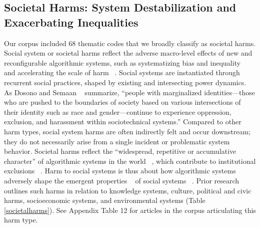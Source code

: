 \subsection{Societal Harms: System Destabilization and Exacerbating Inequalities}
Our corpus included 68 thematic codes that we broadly classify as societal harms. 
Social system or societal harms reflect the adverse macro-level effects of new and reconfigurable algorithmic systems, such as systematizing bias and inequality ~\cite{Eubanks_2018} and accelerating the scale of harm ~\cite{Malik_Viljanen_Lepinkainen_Alvesalo-Kuusi_Others}. Social systems are instantiated through recurrent social practices, shaped by existing and intersecting power dynamics. As Dosono and Semaan ~\cite[p. 2]{Dosono_Semaan_2020} summarize, “people with marginalized identities—those who are pushed to the boundaries of society based on various intersections of their identity such as race and gender—continue to experience oppression, exclusion, and harassment within sociotechnical systems.” Compared to other harm types, social system harms are often indirectly felt and occur downstream; they do not necessarily arise from a single incident or problematic system behavior. Societal harms reflect the “widespread, repetitive or accumulative character” of algorithmic systems in the world ~\cite[p. 10]{Smuha_2021b}, which contribute to institutional exclusions ~\cite{Wang_2020}. Harm to social systems is thus about how algorithmic systems adversely shape the emergent properties ~\cite{Leveson_2016} of social systems ~\cite{Orlikowski_2000}. Prior research outlines such harms in relation to knowledge systems, culture, political and civic harms, socioeconomic systems, and environmental systems (Table \ref{societalharms}). See Appendix Table 12 for articles in the corpus articulating this harm type.

